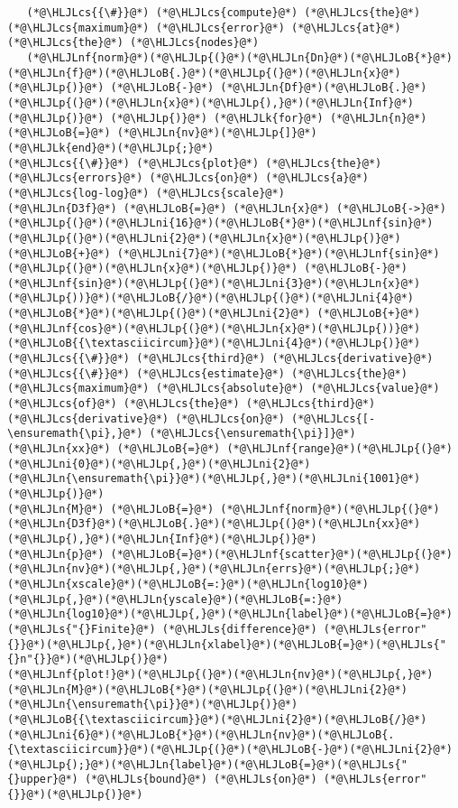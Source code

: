 \documentclass[12pt,landscape]{article}
\newcommand{\HLJLk}[1]{\textcolor[RGB]{148,91,176}{\textbf{#1}}}
\newcommand{\HLJLn}[1]{#1}
\newcommand{\HLJLnf}[1]{\textcolor[RGB]{66,102,213}{#1}}
\newcommand{\HLJLs}[1]{\textcolor[RGB]{201,61,57}{#1}}
\newcommand{\HLJLni}[1]{\textcolor[RGB]{59,151,46}{#1}}
\newcommand{\HLJLoB}[1]{\textcolor[RGB]{102,102,102}{\textbf{#1}}}
\newcommand{\HLJLp}[1]{#1}
\newcommand{\HLJLcs}[1]{\textcolor[RGB]{153,153,119}{\textit{#1}}}
\begin{document}
{\begin{lstlisting}
   (*@\HLJLcs{{\#}}@*) (*@\HLJLcs{compute}@*) (*@\HLJLcs{the}@*) (*@\HLJLcs{maximum}@*) (*@\HLJLcs{error}@*) (*@\HLJLcs{at}@*) (*@\HLJLcs{the}@*) (*@\HLJLcs{nodes}@*)
   (*@\HLJLnf{norm}@*)(*@\HLJLp{(}@*)(*@\HLJLn{Dn}@*)(*@\HLJLoB{*}@*)(*@\HLJLn{f}@*)(*@\HLJLoB{.}@*)(*@\HLJLp{(}@*)(*@\HLJLn{x}@*)(*@\HLJLp{)}@*) (*@\HLJLoB{-}@*) (*@\HLJLn{Df}@*)(*@\HLJLoB{.}@*)(*@\HLJLp{(}@*)(*@\HLJLn{x}@*)(*@\HLJLp{),}@*)(*@\HLJLn{Inf}@*)(*@\HLJLp{)}@*) (*@\HLJLp{)}@*) (*@\HLJLk{for}@*) (*@\HLJLn{n}@*) (*@\HLJLoB{=}@*) (*@\HLJLn{nv}@*)(*@\HLJLp{]}@*)
(*@\HLJLk{end}@*)(*@\HLJLp{;}@*)
(*@\HLJLcs{{\#}}@*) (*@\HLJLcs{plot}@*) (*@\HLJLcs{the}@*) (*@\HLJLcs{errors}@*) (*@\HLJLcs{on}@*) (*@\HLJLcs{a}@*) (*@\HLJLcs{log-log}@*) (*@\HLJLcs{scale}@*)
(*@\HLJLn{D3f}@*) (*@\HLJLoB{=}@*) (*@\HLJLn{x}@*) (*@\HLJLoB{->}@*) (*@\HLJLp{(}@*)(*@\HLJLni{16}@*)(*@\HLJLoB{*}@*)(*@\HLJLnf{sin}@*)(*@\HLJLp{(}@*)(*@\HLJLni{2}@*)(*@\HLJLn{x}@*)(*@\HLJLp{)}@*) (*@\HLJLoB{+}@*) (*@\HLJLni{7}@*)(*@\HLJLoB{*}@*)(*@\HLJLnf{sin}@*)(*@\HLJLp{(}@*)(*@\HLJLn{x}@*)(*@\HLJLp{)}@*) (*@\HLJLoB{-}@*) (*@\HLJLnf{sin}@*)(*@\HLJLp{(}@*)(*@\HLJLni{3}@*)(*@\HLJLn{x}@*)(*@\HLJLp{))}@*)(*@\HLJLoB{/}@*)(*@\HLJLp{(}@*)(*@\HLJLni{4}@*)(*@\HLJLoB{*}@*)(*@\HLJLp{(}@*)(*@\HLJLni{2}@*) (*@\HLJLoB{+}@*) (*@\HLJLnf{cos}@*)(*@\HLJLp{(}@*)(*@\HLJLn{x}@*)(*@\HLJLp{))}@*)(*@\HLJLoB{{\textasciicircum}}@*)(*@\HLJLni{4}@*)(*@\HLJLp{)}@*) (*@\HLJLcs{{\#}}@*) (*@\HLJLcs{third}@*) (*@\HLJLcs{derivative}@*)
(*@\HLJLcs{{\#}}@*) (*@\HLJLcs{estimate}@*) (*@\HLJLcs{the}@*) (*@\HLJLcs{maximum}@*) (*@\HLJLcs{absolute}@*) (*@\HLJLcs{value}@*) (*@\HLJLcs{of}@*) (*@\HLJLcs{the}@*) (*@\HLJLcs{third}@*) (*@\HLJLcs{derivative}@*) (*@\HLJLcs{on}@*) (*@\HLJLcs{[-\ensuremath{\pi},}@*) (*@\HLJLcs{\ensuremath{\pi}]}@*)
(*@\HLJLn{xx}@*) (*@\HLJLoB{=}@*) (*@\HLJLnf{range}@*)(*@\HLJLp{(}@*)(*@\HLJLni{0}@*)(*@\HLJLp{,}@*)(*@\HLJLni{2}@*)(*@\HLJLn{\ensuremath{\pi}}@*)(*@\HLJLp{,}@*)(*@\HLJLni{1001}@*)(*@\HLJLp{)}@*)
(*@\HLJLn{M}@*) (*@\HLJLoB{=}@*) (*@\HLJLnf{norm}@*)(*@\HLJLp{(}@*)(*@\HLJLn{D3f}@*)(*@\HLJLoB{.}@*)(*@\HLJLp{(}@*)(*@\HLJLn{xx}@*)(*@\HLJLp{),}@*)(*@\HLJLn{Inf}@*)(*@\HLJLp{)}@*)
(*@\HLJLn{p}@*) (*@\HLJLoB{=}@*)(*@\HLJLnf{scatter}@*)(*@\HLJLp{(}@*)(*@\HLJLn{nv}@*)(*@\HLJLp{,}@*)(*@\HLJLn{errs}@*)(*@\HLJLp{;}@*)(*@\HLJLn{xscale}@*)(*@\HLJLoB{=:}@*)(*@\HLJLn{log10}@*)(*@\HLJLp{,}@*)(*@\HLJLn{yscale}@*)(*@\HLJLoB{=:}@*)(*@\HLJLn{log10}@*)(*@\HLJLp{,}@*)(*@\HLJLn{label}@*)(*@\HLJLoB{=}@*)(*@\HLJLs{"{}Finite}@*) (*@\HLJLs{difference}@*) (*@\HLJLs{error"{}}@*)(*@\HLJLp{,}@*)(*@\HLJLn{xlabel}@*)(*@\HLJLoB{=}@*)(*@\HLJLs{"{}n"{}}@*)(*@\HLJLp{)}@*)
(*@\HLJLnf{plot!}@*)(*@\HLJLp{(}@*)(*@\HLJLn{nv}@*)(*@\HLJLp{,}@*)(*@\HLJLn{M}@*)(*@\HLJLoB{*}@*)(*@\HLJLp{(}@*)(*@\HLJLni{2}@*)(*@\HLJLn{\ensuremath{\pi}}@*)(*@\HLJLp{)}@*)(*@\HLJLoB{{\textasciicircum}}@*)(*@\HLJLni{2}@*)(*@\HLJLoB{/}@*)(*@\HLJLni{6}@*)(*@\HLJLoB{*}@*)(*@\HLJLn{nv}@*)(*@\HLJLoB{.{\textasciicircum}}@*)(*@\HLJLp{(}@*)(*@\HLJLoB{-}@*)(*@\HLJLni{2}@*)(*@\HLJLp{);}@*)(*@\HLJLn{label}@*)(*@\HLJLoB{=}@*)(*@\HLJLs{"{}upper}@*) (*@\HLJLs{bound}@*) (*@\HLJLs{on}@*) (*@\HLJLs{error"{}}@*)(*@\HLJLp{)}@*)
\end{lstlisting}

}
\end{document}
